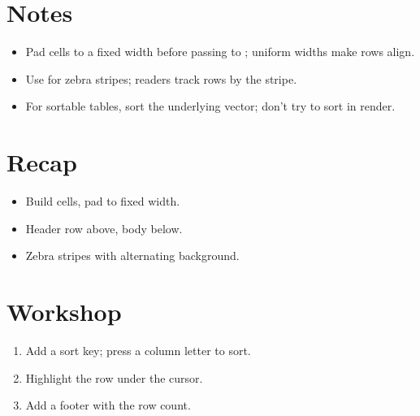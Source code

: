 \section{Notes}

\begin{itemize}[leftmargin=*]
  \item Pad cells to a fixed width before passing to
    ; uniform widths make rows align.
  \item Use  for zebra stripes; readers track
    rows by the stripe.
  \item For sortable tables, sort the underlying vector;
    don't try to sort in render.
\end{itemize}

\section{Recap}

\begin{recap}
\begin{itemize}[leftmargin=*]
  \item Build cells, pad to fixed width.
  \item Header row above, body below.
  \item Zebra stripes with alternating background.
\end{itemize}
\end{recap}

\section*{Workshop}

\begin{enumerate}[leftmargin=*]
  \item Add a sort key; press a column letter to sort.
  \item Highlight the row under the cursor.
  \item Add a footer with the row count.
\end{enumerate}
